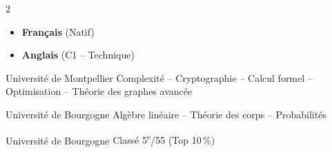 \documentclass[10pt,a4paper,ragged2e,withhyper]{cv}
\begin{document}
\begin{paracol}{2}
  \vfill

   \hfill
   \hfill
   \hfill
  \cvtag{\LaTeX}

  \vfill




  \begin{itemize}[label=\textcolor{accent}{\tiny\faCircle}]
    \item \textbf{Français} (Natif)
    \item \textbf{Anglais} (C1 -- Technique)
  \end{itemize}

  \switchcolumn


  \makecvheaderleft

  \vspace{-0.3cm}

  \vspace{0.3cm}

  {Université de Montpellier}
  {}
  {Complexité -- Cryptographie -- Calcul formel -- Optimisation -- Théorie des graphes avancée}

  \vspace{0.3cm} %

  {Université de Bourgogne}
  {}
  {Algèbre linéaire -- Théorie des corps -- Probabilités }

  \vspace{0.3cm} %

  {Université de Bourgogne}
  {}
  {Classé 5\textsuperscript{e}/55 (Top 10\,\%)}


  \vspace{0.3cm}


\end{paracol}
\end{document}
